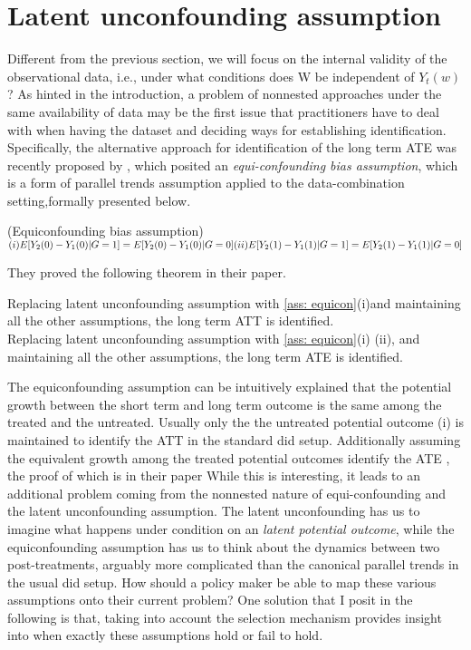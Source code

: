 \documentclass{article}
\begin{document}
\section{Latent unconfounding assumption}











     Different from the previous section, we will focus on the internal validity of the observational data, i.e., under what conditions does W be independent of $Y_t(w)$ ?
     As hinted in the introduction, a problem of nonnested approaches under the same availability of data may be the first issue that practitioners have to deal with when having the dataset and deciding ways for establishing identification.
    Specifically, the alternative approach for identification of the long term ATE was recently proposed by \cite{ghassami et al 2022} , which posited an \textit{equi-confounding bias assumption}, which is a form of parallel trends assumption applied to the data-combination setting,formally presented below.
    \begin{assumption}(Equiconfounding bias assumption)
     \label{ass: equicon}
    $ (i) E[Y_2(0) - Y_1(0)| G= 1] = E[Y_2(0) - Y_1(0) | G=0] \\
     (ii) E[Y_2(1) - Y_1(1)| G= 1] = E[Y_2(1) - Y_1(1) | G=0]$
     \end{assumption}
They proved the following theorem in their paper.
 \begin{theorem}
Replacing latent unconfounding assumption with \ref{ass: equicon}(i)and maintaining all the other assumptions, the long term ATT is identified.\\
Replacing latent unconfounding assumption with \ref{ass: equicon}(i) (ii), and maintaining all the other assumptions, the long term ATE is identified.
 \end{theorem}
The equiconfounding assumption can be intuitively explained that the potential growth between the short term and long term outcome is the same among the treated and the untreated. Usually only the the untreated potential outcome (i) is maintained to identify the ATT in the standard did setup. Additionally assuming the equivalent growth among the treated potential outcomes identify the ATE , the proof of which is in their paper \cite{ghassami 202}
While this is interesting, it leads to an additional problem coming from the nonnested nature of equi-confounding and the latent unconfounding assumption. The latent unconfounding has us to imagine what happens under condition on an \textit{latent potential outcome}, while the equiconfounding assumption has us to think about the dynamics between two post-treatments, arguably more complicated than the canonical parallel trends in the usual did setup.  How should a policy maker be able to map these various assumptions onto their current problem? One solution that I posit in the following is that, taking into account the selection mechanism provides insight into when exactly these assumptions hold or fail to hold.
\end{document}
